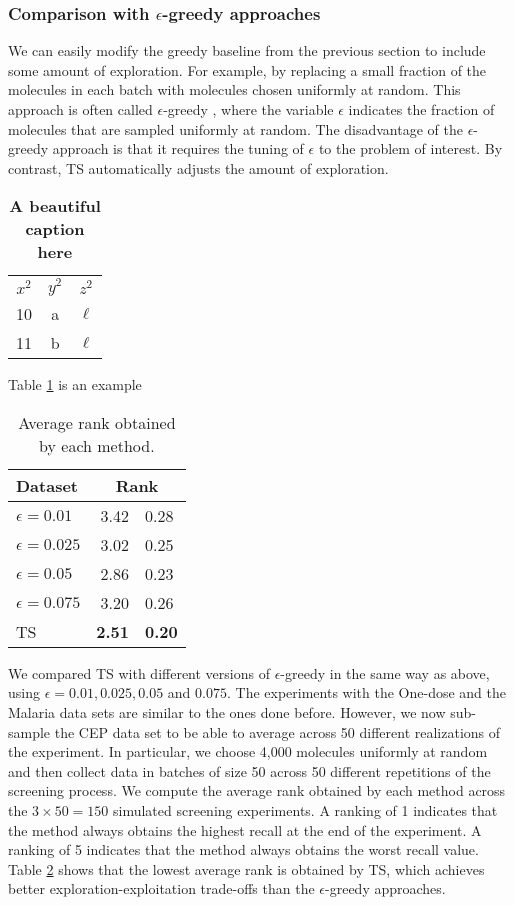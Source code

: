 \subsubsection{Comparison with $\epsilon$-greedy approaches}

We can easily modify the greedy baseline from the previous section to include some amount of exploration. For example, by replacing a small fraction of the molecules in each batch with molecules chosen uniformly at random. This approach is often called $\epsilon$-greedy \cite{watkins1989learning}, where the variable $\epsilon$ indicates the fraction of molecules that are sampled uniformly at random. The disadvantage of the $\epsilon$-greedy approach is that it requires the tuning of $\epsilon$ to the problem of interest. By contrast, TS 
automatically adjusts the amount of exploration. 

\begin{table}
\label{tab:table_label}
\begin{tabular}{ c c c }
 $x^2$ & $y^2$ & $z^2$ \\
 10 & a & $\ell$ \\
 11 & b & $\ell$ \\
\end{tabular}
\caption{\textbf{A beautiful caption here}}
\end{table}

Table \ref{tab:table_label} is an example

\begin{table}
\label{tab:table1}
\begin{tabular}{lr@{$\pm$}l}
\hline
\bf{Dataset}& \multicolumn{2}{c}{\bf{Rank}}\\
\hline
$\epsilon = 0.01$ & 3.42 & 0.28 \\
$\epsilon = 0.025$ & 3.02 & 0.25 \\
$\epsilon = 0.05$ & 2.86 & 0.23 \\
$\epsilon = 0.075$ & 3.20 & 0.26 \\
TS & \bf{2.51} & \bf{0.20} \\
\hline
\end{tabular}
\caption{Average rank obtained by each method.}
\end{table}

We compared TS with different versions of $\epsilon$-greedy in the same way as above, using $\epsilon = 0.01, 0.025, 0.05$ and $0.075$. The experiments with the One-dose and the Malaria data sets are similar to the ones done before. However, we now sub-sample the CEP data set to be able to average across 50 different realizations of the experiment. In particular, we choose 4,000 molecules uniformly at random and then collect data in batches of size 50 across 50 different repetitions of the screening process. We compute the average rank obtained by each method across the $3\times 50 = 150$ simulated screening experiments. A ranking of 1 indicates that the method always obtains the highest recall at the end of the experiment. A ranking of 5 indicates that the method always obtains the worst recall value. Table \ref{tab:table1} shows that the lowest average rank is obtained by TS, which achieves better exploration-exploitation trade-offs than the $\epsilon$-greedy approaches.
